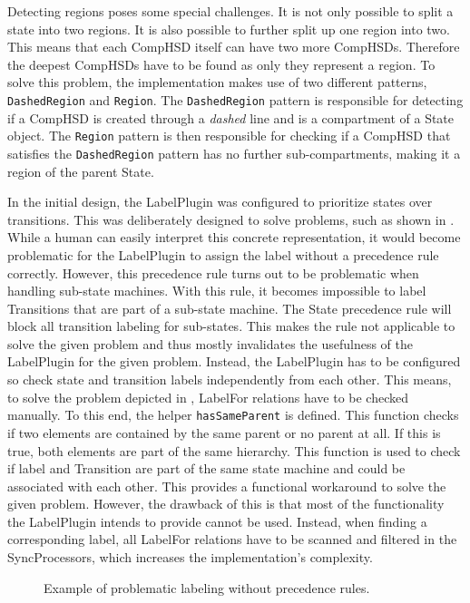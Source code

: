 
Detecting regions poses some special challenges. It is not only possible to split a state into two regions. It is also possible to further split up one region into two. This means that each CompHSD itself can have two more CompHSDs. Therefore the deepest CompHSDs have to be found as only they represent a region. To solve this problem, the implementation makes use of two different patterns, \texttt{DashedRegion} and \texttt{Region}. The \texttt{DashedRegion} pattern is responsible for detecting if a CompHSD is created through a \emph{dashed} line and is a compartment of a State object. The \texttt{Region} pattern is then responsible for checking if a CompHSD that satisfies the \texttt{DashedRegion} pattern has no further sub-compartments, making it a region of the parent State.

In the initial design, the LabelPlugin was configured to prioritize states over transitions. This was deliberately designed to solve problems, such as shown in . While a human can easily interpret this concrete representation, it would become problematic for the LabelPlugin to assign the label without a precedence rule correctly. However, this precedence rule turns out to be problematic when handling sub-state machines. With this rule, it becomes impossible to label Transitions that are part of a sub-state machine. The State precedence rule will block all transition labeling for sub-states. This makes the rule not applicable to solve the given problem and thus mostly invalidates the usefulness of the LabelPlugin for the given problem. Instead, the LabelPlugin has to be configured so check state and transition labels independently from each other. This means, to solve the problem depicted in , LabelFor relations have to be checked manually. To this end, the helper \texttt{hasSameParent} is defined. This function checks if two elements are contained by the same parent or no parent at all. If this is true, both elements are part of the same hierarchy. This function is used to check if label and Transition are part of the same state machine and could be associated with each other. This provides a functional workaround to solve the given problem. However, the drawback of this is that most of the functionality the LabelPlugin intends to provide cannot be used. Instead, when finding a corresponding label, all LabelFor relations have to be scanned and filtered in the SyncProcessors, which increases the implementation’s complexity.  

\begin{figure}
\centering

\caption{Example of problematic labeling without precedence rules.}
\label{fig:close-enough}
\end{figure}

